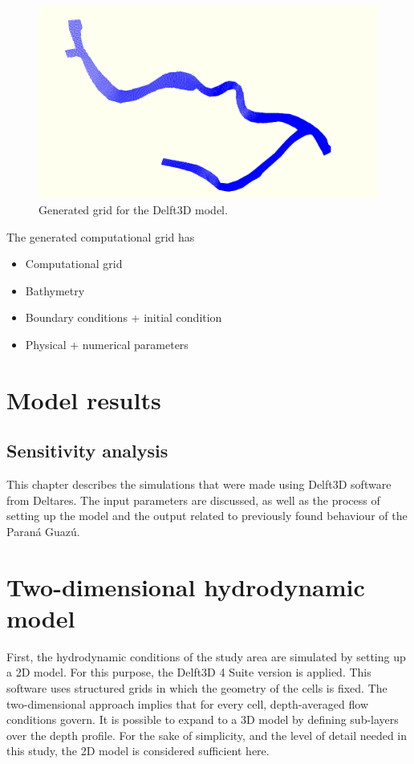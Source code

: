 \begin{figure}[H]
    \centering
    \includegraphics[width=1\linewidth]{figures/ch7/Grid_Guazu.png}
    \caption{Generated grid for the Delft3D model.}
    \label{fig: Grid Guazu Delft3D}
\end{figure}

The generated computational grid has 

\begin{itemize}
    \item Computational grid
    \item Bathymetry
    \item Boundary conditions + initial condition
    \item Physical + numerical parameters
\end{itemize}

\section{Model results}

\subsection{Sensitivity analysis}



This chapter describes the simulations that were made using Delft3D software from Deltares. The input parameters are discussed, as well as the process of setting up the model and the output related to previously found behaviour of the Paraná Guazú. 

\section{Two-dimensional hydrodynamic model}
First, the hydrodynamic conditions of the study area are simulated by setting up a 2D model. For this purpose, the Delft3D 4 Suite version is applied. This software uses structured grids in which the geometry of the cells is fixed. The two-dimensional approach implies that for every cell, depth-averaged flow conditions govern. It is possible to expand to a 3D model by defining sub-layers over the depth profile. For the sake of simplicity, and the level of detail needed in this study, the 2D model is considered sufficient here. 


